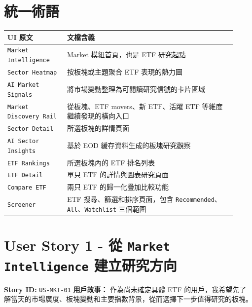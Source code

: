 \section{統一術語}
\begingroup
\small
\begin{longtable}{L{0.24\linewidth}L{0.68\linewidth}}
\toprule
\textbf{UI 原文} & \textbf{文檔含義} \\
\midrule
\texttt{Market Intelligence} & Market 模組首頁，也是 ETF 研究起點 \\
\texttt{Sector Heatmap} & 按板塊或主題聚合 ETF 表現的熱力圖 \\
\texttt{AI Market Signals} & 將市場變動整理為可閱讀研究信號的卡片區域 \\
\texttt{Market Discovery Rail} & 從板塊、ETF movers、新 ETF、活躍 ETF 等維度繼續發現的橫向入口 \\
\texttt{Sector Detail} & 所選板塊的詳情頁面 \\
\texttt{AI Sector Insights} & 基於 EOD 緩存資料生成的板塊研究觀察 \\
\texttt{ETF Rankings} & 所選板塊內的 ETF 排名列表 \\
\texttt{ETF Detail} & 單只 ETF 的詳情與圖表研究頁面 \\
\texttt{Compare ETF} & 兩只 ETF 的歸一化疊加比較功能 \\
\texttt{Screener} & ETF 搜尋、篩選和排序頁面，包含 \texttt{Recommended}、\texttt{All}、\texttt{Watchlist} 三個範圍 \\
\bottomrule
\end{longtable}
\endgroup
\prdhr
\hypertarget{us-mkt-01}{}
\section{User Story 1 - 從 \texttt{Market Intelligence} 建立研究方向}
\textbf{Story ID:} \texttt{US-MKT-01}
\textbf{用戶故事：} 作為尚未確定具體 ETF 的用戶，我希望先了解當天的市場廣度、板塊變動和主要指數背景，從而選擇下一步值得研究的板塊。
